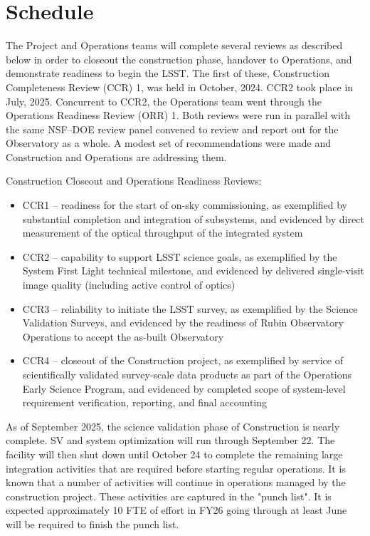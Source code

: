 \section{Schedule}{\label{secSched}}

The Project and Operations teams will complete several reviews as described below in order to closeout the construction phase, handover to Operations, and demonstrate readiness to begin the LSST. The first of these, Construction Completeness Review (CCR) 1, was held in October, 2024. CCR2 took place in July, 2025. Concurrent to CCR2, the Operations team went through the Operations Readiness Review (ORR) 1. Both reviews were run in parallel with the same NSF--DOE review panel convened to review and report out for the Observatory as a whole. A modest set of recommendations were made and Construction and Operations are addressing them. 

Construction Closeout and Operations Readiness Reviews:

\begin{itemize}
\item CCR1 -- readiness for the start of on-sky commissioning, as exemplified by substantial completion and integration of subsystems, and evidenced by direct measurement of the optical throughput of the integrated system

\item CCR2 -- capability to support LSST science goals, as exemplified by the System First Light technical milestone, and evidenced by delivered single-visit image quality (including active control of optics)

\item CCR3 -- reliability to initiate the LSST survey, as exemplified by the Science Validation Surveys, and evidenced by the readiness of Rubin Observatory Operations to accept the as-built Observatory

\item CCR4 -- closeout of the Construction project, as exemplified by service of scientifically validated survey-scale data products as part of the Operations Early Science Program, and evidenced by completed scope of system-level requirement verification, reporting, and final accounting
\end{itemize}

As of September 2025, the science validation phase of Construction is nearly complete. SV and system optimization will run through September 22. The facility will then shut down until October 24 to complete the remaining large integration activities that are required before starting regular operations. It is known that a number of activities will continue in operations managed by the construction project. These activities are captured in the "punch list". It is expected approximately 10 FTE of effort in FY26 going through at least June will be required to finish the punch list. 

